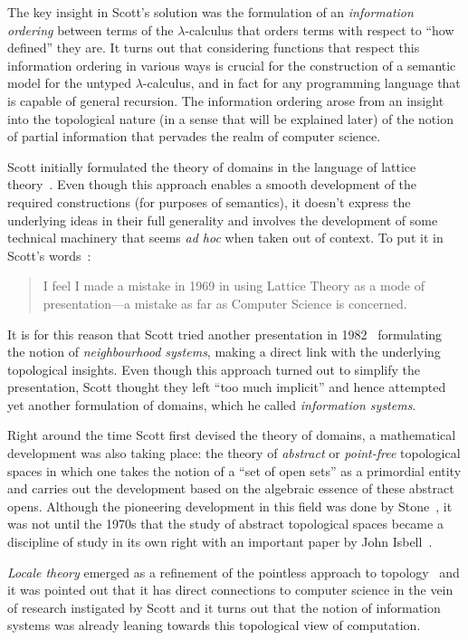 \documentclass{article}
\begin{document}
The key insight in Scott's solution was the formulation of an \emph{information ordering}
between terms of the $\lambda$-calculus that orders terms with respect to ``how defined'' they
are. It turns out that considering functions that respect this information ordering in
various ways is crucial for the construction of a semantic model for the untyped
$\lambda$-calculus, and in fact for any programming language that is capable of general
recursion. The information ordering arose from an insight into the topological nature (in
a sense that will be explained later) of the notion of partial information that pervades
the realm of computer science.

Scott initially formulated the theory of domains in the language of lattice
theory~\cite{birkhoff:1940}. Even though this approach enables a smooth development of the
required constructions (for purposes of semantics), it doesn't express the underlying
ideas in their full generality and involves the development of some technical machinery
that seems \emph{ad hoc} when taken out of context. To put it in Scott's
words~\cite[pg.~577]{scott:1982}:

\begin{quote}
  I feel I made a mistake in 1969 in using Lattice Theory as a mode of
  presentation---a mistake as far as Computer Science is concerned.
\end{quote}

It is for this reason that Scott tried another presentation in 1982~\cite{scott:1981}
formulating the notion of \emph{neighbourhood systems}, making a direct link with the
underlying topological insights. Even though this approach turned out to simplify the
presentation, Scott thought they left ``too much implicit'' and hence attempted yet
another formulation of domains, which he called \emph{information systems}.

Right around the time Scott first devised the theory of domains, a mathematical
development was also taking place: the theory of \emph{abstract} or \emph{point-free}
topological spaces in which one takes the notion of a ``set of open sets'' as a primordial
entity and carries out the development based on the algebraic essence of these abstract
opens. Although the pioneering development in this field was done by
Stone~\cite{stone:1934}, it was not until the 1970s that the study of abstract topological
spaces became a discipline of study in its own right with an important paper by John
Isbell~\cite{isbell:1973}.

\emph{Locale theory} emerged as a refinement of the pointless approach to topology~\cite{
johnstone:1982} and it was pointed out that it has direct connections to computer
science in the vein of research instigated by Scott and it turns out that the notion of
information systems was already leaning towards this topological view of computation.
\end{document}
